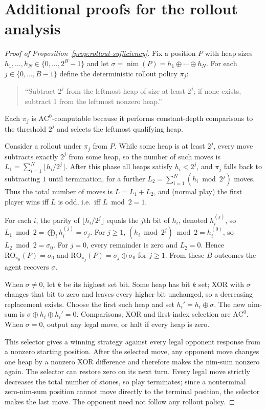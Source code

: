 \documentclass[11pt]{article}
\newcommand{\AC}{\mathrm{AC}}
\theoremstyle{plain}
\theoremstyle{definition}
\theoremstyle{remark}
\numberwithin{equation}{section}
\begin{document}
\section{Additional proofs for the rollout analysis}
\label{app:rollout-proofs}

\begin{proof}[Proof of Proposition~\ref{prop:rollout-sufficiency}]
Fix a position $P$ with heap sizes $h_1,\dots,h_N\in\{0,\dots,2^B-1\}$ and let $\sigma=\operatorname{nim}(P)=h_1\oplus\cdots\oplus h_N$.
For each $j\in\{0,\dots,B-1\}$ define the deterministic rollout policy $\pi_j$:
\begin{quote}
``Subtract $2^j$ from the leftmost heap of size at least $2^j$; if none exists, subtract $1$ from the leftmost nonzero heap.''
\end{quote}
Each $\pi_j$ is $\AC^0$-computable because it performs constant-depth comparisons to the threshold $2^j$ and selects the leftmost qualifying heap.

Consider a rollout under $\pi_j$ from $P$.
While some heap is at least $2^j$, every move subtracts exactly $2^j$ from some heap, so the number of such moves is
$L_1=\sum_{i=1}^N \lfloor h_i/2^j\rfloor$.
After this phase all heaps satisfy $h_i<2^j$, and $\pi_j$ falls back to subtracting $1$ until termination, for a further
$L_2=\sum_{i=1}^N (h_i\bmod 2^j)$ moves.
Thus the total number of moves is $L=L_1+L_2$, and (normal play) the first player wins iff $L$ is odd, i.e.\ iff $L\bmod 2=1$.

For each $i$, the parity of $\lfloor h_i/2^j\rfloor$ equals the $j$th bit of $h_i$, denoted $h_i^{(j)}$, so
$L_1\bmod 2=\bigoplus_i h_i^{(j)}=\sigma_j$.
For $j\ge1$, $(h_i\bmod 2^j)\bmod2=h_i^{(0)}$, so $L_2\bmod2=\sigma_0$. For $j=0$, every remainder is zero and $L_2=0$.
Hence
$\mathrm{RO}_{\pi_0}(P)=\sigma_0$ and $\mathrm{RO}_{\pi_j}(P)=\sigma_j\oplus\sigma_0$ for $j\ge 1$.
From these $B$ outcomes the agent recovers $\sigma$.

When $\sigma\ne0$, let $k$ be its highest set bit. Some heap has bit $k$ set; XOR with $\sigma$ changes that bit to zero and leaves every higher bit unchanged, so a decreasing replacement exists. Choose the first such heap and set $h_i'=h_i\oplus\sigma$. The new nim-sum is $\sigma\oplus h_i\oplus h_i'=0$. Comparisons, XOR and first-index selection are $\AC^0$. When $\sigma=0$, output any legal move, or halt if every heap is zero.

This selector gives a winning strategy against every legal opponent response from a nonzero starting position. After the selected move, any opponent move changes one heap by a nonzero XOR difference and therefore makes the nim-sum nonzero again. The selector can restore zero on its next turn. Every legal move strictly decreases the total number of stones, so play terminates; since a nonterminal zero-nim-sum position cannot move directly to the terminal position, the selector makes the last move. The opponent need not follow any rollout policy.


\end{proof}
\end{document}
